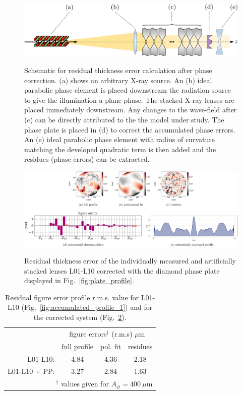 \begin{refsection}
\begin{figure}[t]
        \centering
        {\includegraphics[width=0.6\linewidth]{figures/ch06/recovered_phase_corrected.pdf}}
        \caption[Schematic for residual thickness error calculation after phase correction]{Schematic for residual thickness error calculation after phase correction. (a) shows an arbitrary X-ray source. An (b) ideal parabolic phase element is placed downstream the radiation source to give the illumination a plane phase. The stacked X-ray lenses are placed immediately downstream. Any changes to the wave-field after (c) can be directly attributed to the the model under study. The phase plate is placed in (d) to correct the accumulated phase errors. An (e) ideal parabolic phase element with radius of curvature matching the developed quadratic term is then added and the residues (phase errors) can be extracted.}\label{fig:recovered_phase_corrected}
\end{figure}

\begin{figure}[t]
        \centering
        {\includegraphics[width=1\linewidth]{figures/ch06/residual_profile.pdf}}
        \caption[Residual profile after phase correction]{Residual thickness error of the individually measured and artificially stacked lenses L01-L10 corrected with the diamond phase plate displayed in Fig.~\ref{fig:plate_profile}.}\label{fig:residual_profile}
\end{figure}

\begin{table}[h]
    \caption[Residual figure error profile r.m.s. value for L01-L10 and for the corrected system]{Residual figure error profile r.m.s. value for L01-L10 (Fig.~\ref{fig:accumulated_profile_1}) and for the corrected system (Fig.~\ref{fig:residual_profile}).}
    \centering
    \label{tab:corrected}\small
    \begin{tabular}{rccc}
    \hline \hline
    &\multicolumn{3}{c}{figure errors$^\dagger$ (r.m.s) $\mu$m}\\ \cline{2-4}
    &full profile & pol. fit   & residues \\ \hline
    L01-L10:      &4.84  &4.36  &2.18\\
    L01-L10 + PP: &3.27  &2.84  &1.63\\
    \hline \hline
    \multicolumn{4}{r}{\footnotesize{$^\dagger$ values given for $A_{\diameter}=400~\mu\text{m}$}}     
    \end{tabular}
\end{table}


\end{refsection}
